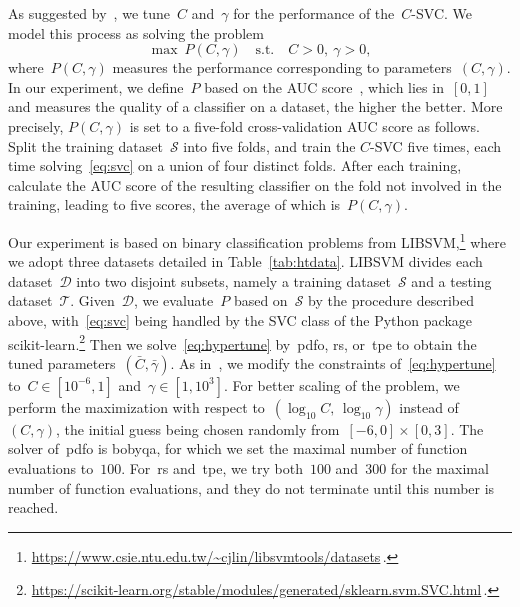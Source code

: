 \documentclass[
    smallextended,  %
    final,          %
]{svjour3}
\newcommand{\st}{\text{s.t.}}
\begin{document}
As suggested by~\cite[\S~9]{Chang_Lin_2011}, we tune~$C$ and~$\gamma$ for the performance of
the~$C$-SVC.
We model this process as solving the problem
\begin{equation}
    \label{eq:hypertune}
    \max ~ P(C, \gamma) \quad \st \quad C > 0,~ \gamma > 0,
\end{equation}
where~$P(C, \gamma)$ measures the performance corresponding to parameters~$(C, \gamma)$. In our experiment,
we define~$P$ based on the AUC score~\cite[\S~3]{Ghanbari_Scheinberg_2017}, which lies in~$[0,1]$
and measures the quality of a classifier on a dataset, the higher the better.
More precisely, $P(C, \gamma)$ is set to a five-fold cross-validation AUC score as follows.
Split the training dataset~$\mathcal{S}$ into five folds, and train the $C$-SVC five times, each time
solving~\eqref{eq:svc} on a union
of four distinct folds. After each training, calculate the AUC score of the resulting classifier
on the fold not involved in the training, leading to five scores, the average of which is~$P(C, \gamma)$.



Our experiment is based on binary classification problems from \mbox{LIBSVM},\footnote{\url{https://www.csie.ntu.edu.tw/~cjlin/libsvmtools/datasets}\,.}
where we adopt three datasets detailed in Table~\ref{tab:htdata}.
LIBSVM divides each dataset~$\mathcal{D}$ into two disjoint subsets, namely a training dataset~$\mathcal{S}$ and
a testing dataset~$\mathcal{T}$.
Given~$\mathcal{D}$, we evaluate~$P$ based on~$\mathcal{S}$ by the procedure
described above, with~\eqref{eq:svc} being handled by the SVC class of the Python package
\mbox{scikit-learn}.\footnote{\url{https://scikit-learn.org/stable/modules/generated/sklearn.svm.SVC.html}\,.}
Then we solve~\eqref{eq:hypertune} by~\gls{pdfo}, \gls{rs}, or~\gls{tpe} to obtain the tuned
parameters~$(\bar{C}, \bar{\gamma})$.
As in~\cite[\S~5.3]{Ghanbari_Scheinberg_2017}, we modify the constraints of~\eqref{eq:hypertune}
to~$C\in[10^{-6}, 1]$ and~$\gamma\in [1, 10^{3}]$. For better scaling of the problem,
we perform the maximization with respect to~$(\log_{10}C,\, \log_{10}\gamma)$ instead of~$(C,
\gamma)$, the initial guess being chosen randomly from~$[-6, 0]\times[0, 3]$. The solver
of~\gls{pdfo} is \gls{bobyqa}, for which we set the maximal number of function evaluations to~$100$.
For~\gls{rs} and~\gls{tpe}, we try both~$100$ and~$300$ for the maximal number of function
evaluations, and they do not terminate until this number is reached.
\end{document}
